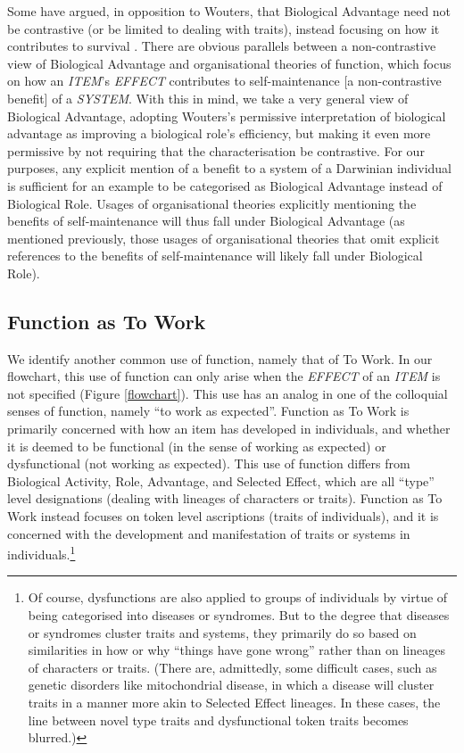 \documentclass{article}
\begin{document}
Some have argued, in opposition to Wouters, that Biological Advantage need not be contrastive (or be limited to dealing with traits), instead focusing on how it contributes to survival \cite{garson2016, buller1998}.
There are obvious parallels between a non-contrastive view of Biological Advantage and organisational theories of function, which focus on how an \emph{ITEM}'s \emph{EFFECT} contributes to self-maintenance [a non-contrastive benefit] of a \emph{SYSTEM}.
With this in mind, we take a very general view of Biological Advantage, adopting Wouters's permissive interpretation of biological advantage as improving a biological role's efficiency, but making it even more permissive by not requiring that the characterisation be contrastive.
For our purposes, any explicit mention of a benefit to a system of a Darwinian individual is sufficient for an example to be categorised as Biological Advantage instead of Biological Role.
Usages of organisational theories explicitly mentioning the benefits of self-maintenance will thus fall under Biological Advantage (as mentioned previously, those usages of organisational theories that omit explicit references to the benefits of self-maintenance will likely fall under Biological Role).

\subsection{Function as To Work}
\label{sec:funct-as-perf}

We identify another common use of function, namely that of To Work.
In our flowchart, this use of function can only arise when the \emph{EFFECT} of an \emph{ITEM} is not specified (Figure \ref{flowchart}).
This use has an analog in one of the colloquial senses of function, namely ``to work as expected''.
Function as To Work is primarily concerned with how an item has developed in individuals, and whether it is deemed to be functional (in the sense of working as expected) or dysfunctional (not working as expected).
This use of function differs from Biological Activity, Role, Advantage, and Selected Effect, which are all ``type'' level designations (dealing with lineages of characters or traits).
Function as To Work instead focuses on token level ascriptions (traits of individuals), and it is concerned with the development and manifestation of traits or systems in individuals.\footnote{Of course, dysfunctions are also applied to groups of individuals by virtue of being categorised into diseases or syndromes.
But to the degree that diseases or syndromes cluster traits and systems, they primarily do so based on similarities in how or why ``things have gone wrong'' rather than on lineages of characters or traits.
(There are, admittedly, some difficult cases, such as genetic disorders like mitochondrial disease, in which a disease will cluster traits in a manner more akin to Selected Effect lineages. In these cases, the line between novel type traits and dysfunctional token traits becomes blurred.)}
\end{document}
